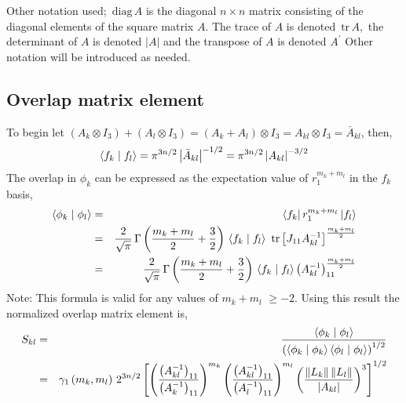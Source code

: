 \documentclass[12pt,doublespace]{article}
\begin{document}
Other notation used; $\,\mathrm{diag}\,A$ is the diagonal $n\times n$ matrix
consisting of the diagonal elements of the square matrix $A.$ The trace of $%
A $ is denoted $\,\mathrm{tr}\,A,$ the determinant of $A$ is denoted $|A|$
and the transpose of $A$ is denoted $A^{\prime }$ Other notation will be
introduced as needed.

\subsection{Overlap matrix element}

To begin let $\left( A_{k}\otimes I_{3}\right) +\left( A_{l}\otimes
I_{3}\right) =\left( A_{k}+A_{l}\right) \otimes I_{3}=A_{kl}\otimes I_{3}=%
\bar{A}_{kl}$, then, 
\begin{equation}
\left\langle f_{k}\right. |\left. f_{l}\right\rangle =\pi ^{3n/2}\left| \bar{%
A}_{kl}\right| ^{-1/2}=\pi ^{3n/2}\left| A_{kl}\right| ^{-3/2}
\end{equation}
The overlap in $\phi _{k}$ can be expressed as the expectation value of $%
r_{1}^{m_{k}+m_{l}}$ in the $f_{k}$ basis, 
\begin{eqnarray}
\left\langle \phi _{k}\right. |\left. \phi _{l}\right\rangle &=&\left\langle
f_{k}\right| r_{1}^{m_{k}+m_{l}}\left| f_{l}\right\rangle  \label{ov1} \\
&=&\frac{2}{\sqrt{\pi }}\,\Gamma \left( \frac{m_{k}+m_{l}}{2}+\frac{3}{2}%
\right) \,\left\langle f_{k}\right. |\left. f_{l}\right\rangle \,\,\mathrm{tr%
}\left[ J_{11}A_{kl}^{-1}\right] ^{\frac{m_{k}+m_{l}}{2}}  \notag \\
&=&\frac{2}{\sqrt{\pi }}\,\Gamma \left( \frac{m_{k}+m_{l}}{2}+\frac{3}{2}%
\right) \,\left\langle f_{k}\right. |\left. f_{l}\right\rangle \left(
A_{kl}^{-1}\right) _{11}^{\frac{m_{k}+m_{l}}{2}}  \notag
\end{eqnarray}
Note: This formula is valid for any values of $m_{k}+m_{l}$ $\geqslant -2.$
Using this result the normalized overlap matrix element is, 
\begin{eqnarray}
S_{kl} &=&\frac{\left\langle \phi _{k}\right. |\left. \phi _{l}\right\rangle 
}{\left( \left\langle \phi _{k}\right. |\left. \phi _{k}\right\rangle
\left\langle \phi _{l}\right. |\left. \phi _{l}\right\rangle \right) ^{1/2}}
\label{Skl} \\
&=&\gamma _{1}\left( m_{k},m_{l}\right) \,2^{3n/2}\left[ \left( \frac{\left(
A_{kl}^{-1}\right) _{11}}{\left( A_{k}^{-1}\right) _{11}}\right)
^{m_{k}}\left( \frac{\left( A_{kl}^{-1}\right) _{11}}{\left(
A_{l}^{-1}\right) _{11}}\right) ^{m_{l}}\left( \frac{\left\| L_{k}\right\|
\left\| L_{l}\right\| }{\left| A_{kl}\right| }\right) ^{3}\right] ^{1/2} 
\notag
\end{eqnarray}
\end{document}
